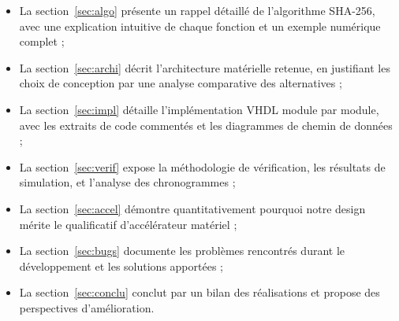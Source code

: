 \begin{itemize}
    \item La section~\ref{sec:algo} présente un rappel détaillé de l'algorithme SHA-256, avec une explication intuitive de chaque fonction et un exemple numérique complet ;
    \item La section~\ref{sec:archi} décrit l'architecture matérielle retenue, en justifiant les choix de conception par une analyse comparative des alternatives ;
    \item La section~\ref{sec:impl} détaille l'implémentation VHDL module par module, avec les extraits de code commentés et les diagrammes de chemin de données ;
    \item La section~\ref{sec:verif} expose la méthodologie de vérification, les résultats de simulation, et l'analyse des chronogrammes ;
    \item La section~\ref{sec:accel} démontre quantitativement pourquoi notre design mérite le qualificatif d'accélérateur matériel ;
    \item La section~\ref{sec:bugs} documente les problèmes rencontrés durant le développement et les solutions apportées ;
    \item La section~\ref{sec:conclu} conclut par un bilan des réalisations et propose des perspectives d'amélioration.
\end{itemize}

